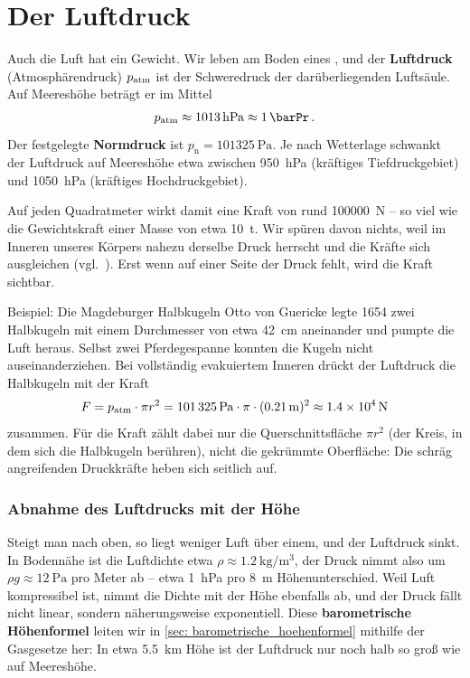 \section{Der Luftdruck}\label{sec: luftdruck}
Auch die Luft hat ein Gewicht. Wir leben am Boden eines , und der \textbf{Luftdruck} (Atmosphärendruck) $p_{\mathrm{atm}}$ ist der Schweredruck der darüberliegenden Luftsäule. Auf Meereshöhe beträgt er im Mittel
\begin{equation}
    p_{\atm} \approx \SI{1013}{\hecto\pascal} \approx \SI{1}{\barPr} \mDot
\end{equation}
Der festgelegte \textbf{Normdruck} ist $p_\text{n} = \SI{101325}{\pascal}$. Je nach Wetterlage schwankt der Luftdruck auf Meereshöhe etwa zwischen \SI{950}{\hecto\pascal} (kräftiges Tiefdruckgebiet) und \SI{1050}{\hecto\pascal} (kräftiges Hochdruckgebiet).

Auf jeden Quadratmeter wirkt damit eine Kraft von rund \SI{100000}{\newton} -- so viel wie die Gewichtskraft einer Masse von etwa \SI{10}{\tonne}. Wir spüren davon nichts, weil im Inneren unseres Körpers nahezu derselbe Druck herrscht und die Kräfte sich ausgleichen (vgl.~\cite[S.~456]{Giancoli2010}). Erst wenn auf einer Seite der Druck fehlt, wird die Kraft sichtbar.

\begin{examplebox}[]{Beispiel: Die Magdeburger Halbkugeln}
    Otto von Guericke legte 1654 zwei Halbkugeln mit einem Durchmesser von etwa \SI{42}{\centi\meter} aneinander und pumpte die Luft heraus. Selbst zwei Pferdegespanne konnten die Kugeln nicht auseinanderziehen. Bei vollständig evakuiertem Inneren drückt der Luftdruck die Halbkugeln mit der Kraft
    \begin{equation*}
        F = p_{\mathrm{atm}} \cdot \pi r^2 = \SI{101325}{\pascal} \cdot \pi \cdot (\SI{0.21}{\meter})^2 \approx \SI{1.4e4}{\newton}
    \end{equation*}
    zusammen. Für die Kraft zählt dabei nur die Querschnittsfläche $\pi r^2$ (der Kreis, in dem sich die Halbkugeln berühren), nicht die gekrümmte Oberfläche: Die schräg angreifenden Druckkräfte heben sich seitlich auf.
\end{examplebox}

\subsubsection*{Abnahme des Luftdrucks mit der Höhe}
Steigt man nach oben, so liegt weniger Luft über einem, und der Luftdruck sinkt. In Bodennähe ist die Luftdichte etwa $\rho \approx \SI{1.2}{\kilogram\per\meter\cubed}$, der Druck nimmt also um $\rho g \approx \SI{12}{\pascal}$ pro Meter ab -- etwa \SI{1}{\hecto\pascal} pro \SI{8}{\meter} Höhenunterschied. Weil Luft kompressibel ist, nimmt die Dichte mit der Höhe ebenfalls ab, und der Druck fällt nicht linear, sondern näherungsweise exponentiell. Diese \textbf{barometrische Höhenformel} leiten wir in \cref{sec: barometrische_hoehenformel} mithilfe der Gasgesetze her: In etwa \SI{5.5}{\kilo\meter} Höhe ist der Luftdruck nur noch halb so groß wie auf Meereshöhe.

